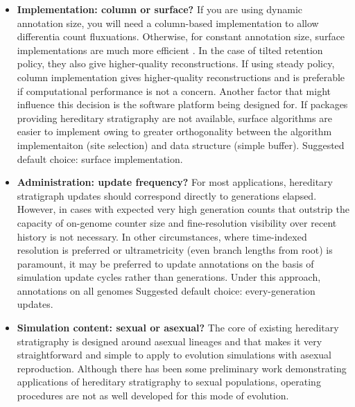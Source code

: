 \begin{itemize}
  In scenarios where explicitly differentiating between founding clades is paramount, consider adding a systematically assigned founder ID or randomly generated fixed tag.
  This tag would then be as a first pass to divvy end genomes between founding origins before feeding into the rest of the reconstruction pipeline.
  \footnote{One possible exception is cases where a global monotonic counter is available and it is desirable to demarcate phylogenetic history in terms of simulation time rather than generations.}
\item \textbf{Implementation: column or surface?}
  If you are using dynamic annotation size, you will need a column-based implementation to allow differentia count fluxuations.
  Otherwise, for constant annotation size, surface implementations are much more efficient \citep{TODOOTHERPAPER}.
  In the case of tilted retention policy, they also give higher-quality reconstructions.
  If using steady policy, column implementation gives higher-quality reconstructions and is preferable if computational performance is not a concern.
  Another factor that might influence this decision is the software platform being designed for.
  If packages providing hereditary stratigraphy are not available, surface algorithms are easier to implement owing to greater orthogonality between the algorithm implementaiton (site selection) and data structure (simple buffer).
  Suggested default choice: surface implementation.
\item \textbf{Administration: update frequency?}
  For most applications, hereditary stratigraph updates should correspond directly to generations elapsed.
  However, in cases with expected very high generation counts that outstrip the capacity of on-genome counter size and fine-resolution visibility over recent history is not necessary.
  In other circumstances, where time-indexed resolution is preferred or ultrametricity (even branch lengths from root) is paramount, it may be preferred to update annotations on the basis of simulation update cycles rather than generations.
  Under this approach, annotations on all genomes
  Suggested default choice: every-generation updates.
\item \textbf{Simulation content: sexual or asexual?}
  The core of existing hereditary stratigraphy is designed around asexual lineages and that makes it very straightforward and simple to apply to evolution simulations with asexual reproduction.
  Although there has been some preliminary work demonstrating applications of hereditary stratigraphy to sexual populations, operating procedures are not as well developed for this mode of evolution.

\end{itemize}

